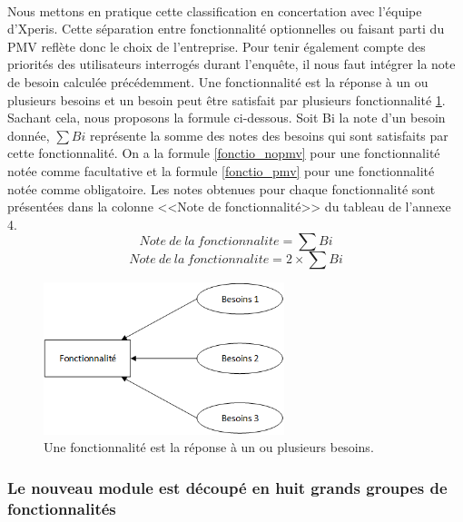 			\paragraph{}%
			Nous mettons en pratique cette classification en concertation avec l'équipe
			d'Xperis. Cette séparation entre fonctionnalité optionnelles ou faisant parti
			du PMV reflète donc le choix de l'entreprise.
			Pour tenir également compte des priorités des utilisateurs interrogés durant
			l'enquête, il nous faut intégrer la note de besoin calculée précédemment. Une
			fonctionnalité est la réponse à un ou plusieurs besoins et un besoin peut
			être satisfait par plusieurs fonctionnalité \ref{mapping_besoins}. Sachant
			cela, nous proposons la formule ci-dessous.
			Soit Bi la note d'un besoin donnée, \begin{math}\sum Bi\end{math} représente la somme des notes des besoins qui
			sont satisfaits par cette fonctionnalité. On a la formule \ref{fonctio_nopmv}
			pour une fonctionnalité notée comme facultative et la formule
			\ref{fonctio_pmv} pour une fonctionnalité notée comme obligatoire. Les notes
			obtenues pour chaque fonctionnalité sont présentées dans la colonne <<Note
			de fonctionnalité>> du tableau de l'annexe 4.
			\begin{equation}
				\label{fonctio_nopmv}
				Note\ de\ la\ fonctionnalite=\sum Bi
			\end{equation}
			\begin{equation}
				\label{fonctio_pmv}
				Note\ de\ la\ fonctionnalite=2\times \sum Bi
			\end{equation}
			\begin{figure}[H]
				\centering
				\includegraphics[width=7cm]{../img/part2/mapping_besoins.png}
				\caption{\label{mapping_besoins} Une fonctionnalité est la réponse à un ou
				plusieurs besoins.}
			\end{figure}
			
		\subsubsection{Le nouveau module est découpé en huit grands groupes de
		fonctionnalités}
